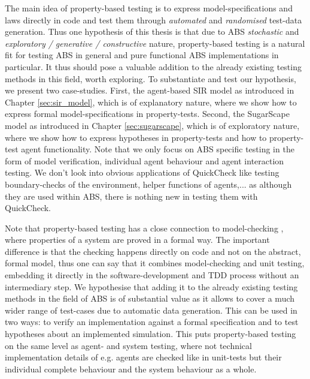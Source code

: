 \medskip

The main idea of property-based testing is to express model-specifications and laws directly in code and test them through \textit{automated} and \textit{randomised} test-data generation. Thus one hypothesis of this thesis is that due to ABS \textit{stochastic} and \textit{exploratory / generative / constructive } nature, property-based testing is a natural fit for testing ABS in general and pure functional ABS implementations in particular. It thus should pose a valuable addition to the already existing testing methods in this field, worth exploring. To substantiate and test our hypothesis, we present two case-studies. First, the agent-based SIR model as introduced in Chapter \ref{sec:sir_model}, which is of explanatory nature, where we show how to express formal model-specifications in property-tests. Second, the SugarScape model as introduced in Chapter \ref{sec:sugarscape}, which is of exploratory nature, where we show how to express hypotheses in property-tests and how to property-test agent functionality. Note that we only focus on ABS specific testing in the form of model verification, individual agent behaviour and agent interaction testing. We don't look into obvious applications of QuickCheck like testing boundary-checks of the environment, helper functions of agents,... as although they are used within ABS, there is nothing new in testing them with QuickCheck.

\medskip

Note that property-based testing has a close connection to model-checking \cite{mcmillan_symbolic_1993}, where properties of a system are proved in a formal way. The important difference is that the checking happens directly on code and not on the abstract, formal model, thus one can say that it combines model-checking and unit testing, embedding it directly in the software-development and TDD process without an intermediary step. We hypothesise that adding it to the already existing testing methods in the field of ABS is of substantial value as it allows to cover a much wider range of test-cases due to automatic data generation. This can be used in two ways: to verify an implementation against a formal specification and to test hypotheses about an implemented simulation. This puts property-based testing on the same level as agent- and system testing, where not technical implementation details of e.g. agents are checked like in unit-tests but their individual complete behaviour and the system behaviour as a whole.

